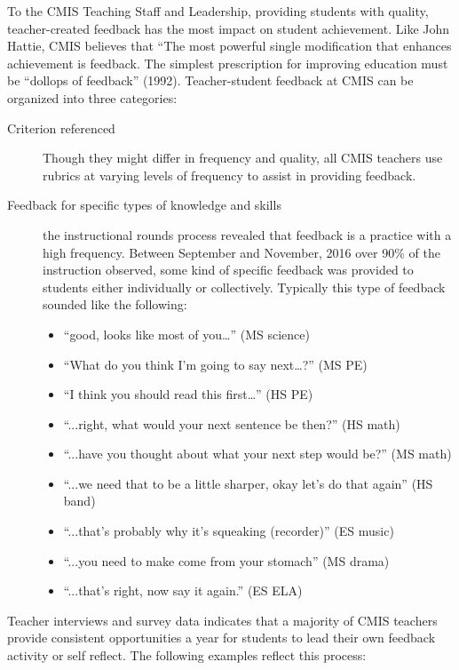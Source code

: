 \begin{findings}

To the CMIS Teaching Staff and Leadership, providing students with quality, teacher-created feedback has the most impact on student achievement. Like John Hattie, CMIS believes that “The most powerful single modification that enhances achievement is feedback. The simplest prescription for improving education must be “dollops of feedback” (1992). Teacher-student feedback at CMIS can be organized into three categories:

\begin{description}
\item [Criterion referenced] Though they might differ in frequency and quality, all CMIS teachers use  rubrics at varying levels of frequency to assist in providing feedback. 
\item [Feedback for specific types of knowledge and skills] the instructional rounds process revealed that feedback is a practice with a high frequency. Between September and November, 2016 over 90\% of the instruction observed, some kind of specific feedback was provided to students either individually or collectively. Typically this type of feedback sounded like the following:
\begin{itemize}
\item ``good, looks like most of you…'' (MS science)
\item ``What do you think I’m going to say next…?'' (MS PE)
\item ``I think you should read this first…'' (HS PE)
\item ``...right, what would your next sentence be then?'' (HS math)
\item ``...have you thought about what your next step would be?'' (MS math)
\item ``...we need that to be a little sharper, okay let’s do that again'' (HS band)
\item ``...that’s probably why it's squeaking (recorder)'' (ES music)
\item ``...you need to make come from your stomach'' (MS drama)
\item ``...that’s right, now say it again.'' (ES ELA)
\end{itemize}

\end{description}

     
 
Teacher interviews and survey data indicates that a majority of CMIS teachers provide consistent opportunities a year for students to lead their own feedback activity or self reflect. The following examples reflect this process: 


\end{findings}
